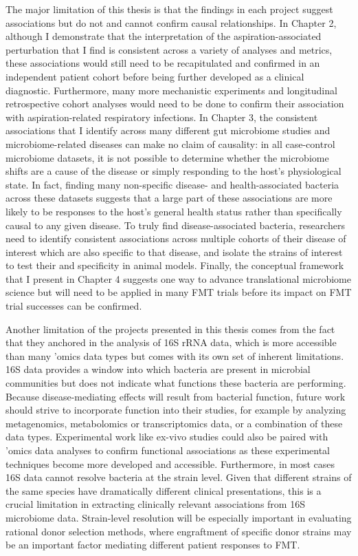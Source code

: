 The major limitation of this thesis is that the findings in each project suggest associations but do not and cannot confirm causal relationships.
In Chapter 2, although I demonstrate that the interpretation of the aspiration-associated perturbation that I find is consistent across a variety of analyses and metrics, these associations would still need to be recapitulated and confirmed in an independent patient cohort before being further developed as a clinical diagnostic.
Furthermore, many more mechanistic experiments and longitudinal retrospective cohort analyses would need to be done to confirm their association with aspiration-related respiratory infections.
In Chapter 3, the consistent associations that I identify across many different gut microbiome studies and microbiome-related diseases can make no claim of causality: in all case-control microbiome datasets, it is not possible to determine whether the microbiome shifts are a cause of the disease or simply responding to the host's physiological state.
In fact, finding many non-specific disease- and health-associated bacteria across these datasets suggests that a large part of these associations are more likely to be responses to the host's general health status rather than specifically causal to any given disease.
To truly find disease-associated bacteria, researchers need to identify consistent associations across multiple cohorts of their disease of interest which are also specific to that disease, and isolate the strains of interest to test their and specificity in animal models.
Finally, the conceptual framework that I present in Chapter 4 suggests one way to advance translational microbiome science but will need to be applied in many FMT trials before its impact on FMT trial successes can be confirmed.

Another limitation of the projects presented in this thesis comes from the fact that they anchored in the analysis of 16S rRNA data, which is more accessible than many 'omics data types but comes with its own set of inherent limitations.
16S data provides a window into which bacteria are present in microbial communities but does not indicate what functions these bacteria are performing.
Because disease-mediating effects will result from bacterial function, future work should strive to incorporate function into their studies, for example by analyzing metagenomics, metabolomics or transcriptomics data, or a combination of these data types.
Experimental work like ex-vivo studies could also be paired with 'omics data analyses to confirm functional associations as these experimental techniques become more developed and accessible.
Furthermore, in most cases 16S data cannot resolve bacteria at the strain level.
Given that different strains of the same species have dramatically different clinical presentations, this is a crucial limitation in extracting clinically relevant associations from 16S microbiome data.
Strain-level resolution will be especially important in evaluating rational donor selection methods, where engraftment of specific donor strains may be an important factor mediating different patient responses to FMT.

